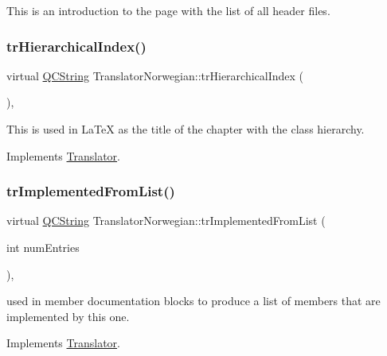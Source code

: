 This is an introduction to the page with the list of all header files. \mbox{\label{class_translator_norwegian_af7745b75b85b42d0d9fa02f706f3a705}} 
\subsubsection{\texorpdfstring{trHierarchicalIndex()}{trHierarchicalIndex()}}
{\footnotesize\ttfamily virtual \mbox{\hyperlink{class_q_c_string}{Q\+C\+String}} Translator\+Norwegian\+::tr\+Hierarchical\+Index (\begin{DoxyParamCaption}{ }\end{DoxyParamCaption})\hspace{0.3cm}{\ttfamily [inline]}, {\ttfamily [virtual]}}

This is used in La\+TeX as the title of the chapter with the class hierarchy. 

Implements \mbox{\hyperlink{class_translator}{Translator}}.

\mbox{\label{class_translator_norwegian_a0644c1c4b880ed462d96876938c96627}} 
\subsubsection{\texorpdfstring{trImplementedFromList()}{trImplementedFromList()}}
{\footnotesize\ttfamily virtual \mbox{\hyperlink{class_q_c_string}{Q\+C\+String}} Translator\+Norwegian\+::tr\+Implemented\+From\+List (\begin{DoxyParamCaption}\item[{int}]{num\+Entries }\end{DoxyParamCaption})\hspace{0.3cm}{\ttfamily [inline]}, {\ttfamily [virtual]}}

used in member documentation blocks to produce a list of members that are implemented by this one. 

Implements \mbox{\hyperlink{class_translator}{Translator}}.

\mbox{\label{class_translator_norwegian_a6bee34e08e47d65bd77b82f9dd0ee184}} 
